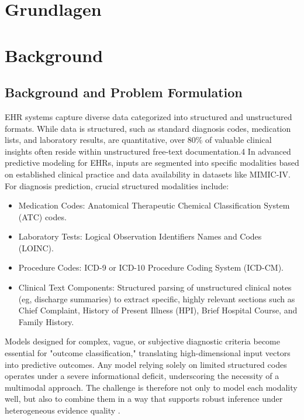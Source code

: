 {\chapter{Grundlagen}}
{\chapter{Background}}
\label{sec:background}

\section{Background and Problem Formulation}
\label{sec:background-problem}

EHR systems capture diverse data categorized into structured and unstructured formats. While data is structured, such as standard diagnosis codes, medication lists, and laboratory results, are quantitative, over 80\% of valuable clinical insights often reside within unstructured free-text documentation.4
In advanced predictive modeling for EHRs, inputs are segmented into specific modalities based on established clinical practice and data availability in datasets like MIMIC-IV. For diagnosis prediction, crucial structured modalities include:
\begin{itemize}
    \item Medication Codes: Anatomical Therapeutic Chemical Classification System (ATC) codes.
    \item Laboratory Tests: Logical Observation Identifiers Names and Codes (LOINC).
    \item Procedure Codes: ICD-9 or ICD-10 Procedure Coding System (ICD-CM).
    \item Clinical Text Components: Structured parsing of unstructured clinical notes (eg, discharge summaries) to extract specific, highly relevant sections such as Chief Complaint, History of Present Illness (HPI), Brief Hospital Course, and Family History.
\end{itemize}
Models designed for complex, vague, or subjective diagnostic criteria become essential for "outcome classification," translating high-dimensional input vectors into predictive outcomes. Any model relying solely on limited structured codes operates under a severe informational deficit, underscoring the necessity of a multimodal approach. The challenge is therefore not only to model each modality well, but also to combine them in a way that supports robust inference under heterogeneous evidence quality \cite{rajkomar2018scalable}.

